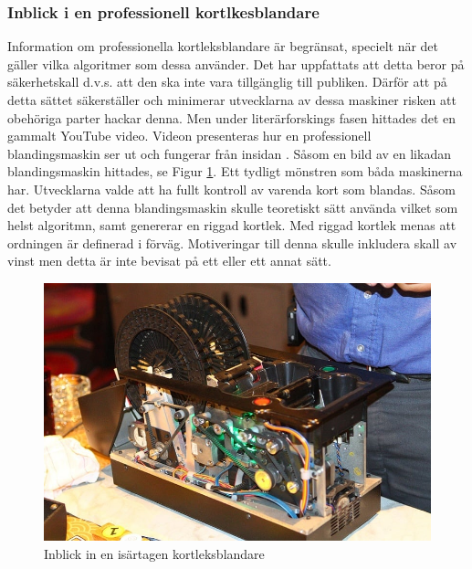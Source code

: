 \documentclass[swedish,a4paper]{article}
\begin{document}
\subsubsection{Inblick i en professionell kortlkesblandare}
\label{sec:wheel}

\noindent
\begin{minipage}{0.5\textwidth}
Information om professionella kortleksblandare är 
begränsat, specielt när det gäller vilka algoritmer som dessa
använder. Det 
har uppfattats att detta beror på säkerhetskall d.v.s. att den ska
inte vara tillgänglig till
publiken. Därför att på detta sättet säkerställer och
minimerar utvecklarna av dessa maskiner risken att
obehöriga parter hackar denna. 
Men under literärforskings fasen hittades det en gammalt YouTube 
video. Videon presenteras hur en professionell blandingsmaskin ser ut och
fungerar från insidan \parencite{shufflerVideo}. Såsom en bild av en likadan 
blandingsmaskin hittades, se Figur \ref{fig:casino_shuffler}. Ett 
tydligt mönstren som båda maskinerna har. Utvecklarna valde att ha 
fullt kontroll av varenda kort som blandas. Såsom det betyder att denna
blandingsmaskin skulle teoretiskt sätt använda vilket som helst
algoritmn, samt genererar en riggad kortlek. Med riggad kortlek
menas att ordningen är definerad i förväg. Motiveringar till denna skulle
inkludera skall av vinst men detta är
inte bevisat på ett eller ett annat sätt. 
\end{minipage}%
\hfill
\begin{minipage}{0.5\linewidth}
\begin{figure}[H]
    \centering
    \includegraphics[width=0.9\linewidth]{automatic_card_shuffler.jpg}
    \captionsetup{width=0.5\linewidth}
    \caption{Inblick in en isärtagen kortleksblandare}
    \label{fig:casino_shuffler}
\end{figure}
\end{minipage}
\end{document}
